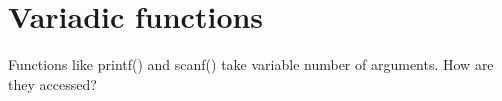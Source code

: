 \ifdefined\RUSSIAN
\else
\chapter{Variadic functions}

Functions like printf() and scanf() take variable number of arguments.
How are they accessed?




\fi
